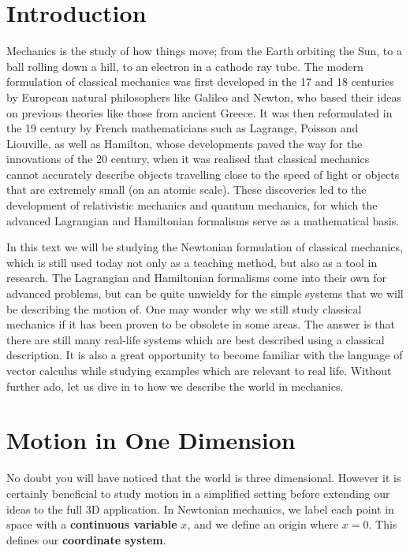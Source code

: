 \documentclass[../classical_mechanics.tex]{subfiles}
\begin{document}
    \section{Introduction}\label{sec:introduction}
        Mechanics is the study of how things move; from the Earth orbiting the Sun, to a ball rolling down a hill, to an electron in a cathode ray tube.
        The modern formulation of classical mechanics was first developed in the 17 and 18 centuries by European natural philosophers like Galileo and Newton, who based their ideas on previous theories like those from ancient Greece.
        It was then reformulated in the 19 century by French mathematicians such as Lagrange, Poisson and Liouville, as well as Hamilton, whose developments paved the way for the innovations of the 20 century, when it was realised that classical mechanics cannot accurately describe objects travelling close to the speed of light or objects that are extremely small (on an atomic scale).
        These discoveries led to the development of relativistic mechanics and quantum mechanics, for which the advanced Lagrangian and Hamiltonian formalisms serve as a mathematical basis.

        In this text we will be studying the Newtonian formulation of classical mechanics, which is still used today not only as a teaching method, but also as a tool in research.
        The Lagrangian and Hamiltonian formalisms come into their own for advanced problems, but can be quite unwieldy for the simple systems that we will be describing the motion of.
        One may wonder why we still study classical mechanics if it has been proven to be obsolete in some areas.
        The answer is that there are still many real-life systems which are best described using a classical description.
        It is also a great opportunity to become familiar with the language of vector calculus while studying examples which are relevant to real life.
        Without further ado, let us dive in to how we describe the world in mechanics.

    \section{Motion in One Dimension}\label{sec:motion-in-one-dimension}
        No doubt you will have noticed that the world is three dimensional.
        However it is certainly beneficial to study motion in a simplified setting before extending our ideas to the full 3D application.
        In Newtonian mechanics, we label each point in space with a \textbf{continuous variable} $x$, and we define an origin where $x=0$.
        This defines our \textbf{coordinate system}.
        
\end{document}
